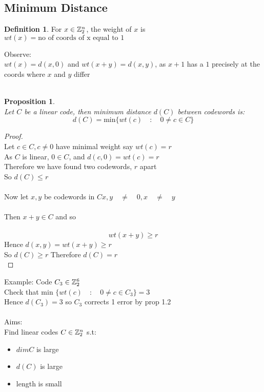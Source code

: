\documentclass[]{article}
\newtheorem{prop}[thm]{Proposition}
\theoremstyle{definition}
\newtheorem*{defn}{Definition}
\theoremstyle{remark}
\numberwithin{equation}{section}
\begin{document}
	\subsection{Minimum Distance}
		\begin{defn}
			For $x \in \mathbb{Z}_2^n$, the weight of $x$ is $wt(x) = \text{no of coords of x equal to 1}$
		\end{defn}
		Observe:\\
		$wt(x) = d(x, 0)$ and $wt(x+y) = d(x,y)$, as $x+1$ has a $1$ precisely at the coords where $x$ and $y$ differ\\
		\\
		\begin{prop}\hfill\\
		Let $C$ be a linear code, then minimum distance $d(C)$ between codewords is:\\
		\[
			d(C) = \text{min} \{ wt(c)\quad:\quad 0 \neq c \in C\}
		\]
		\end{prop}
		\begin{proof}\hfill\\
		Let $c \in C, c \neq 0$ have minimal weight say $wt(c) = r$\\
		As $C$ is linear, $0 \in C$, and $d(c,0) = wt(c) = r$\\
		Therefore we have found two codewords, $r$ apart\\
		So $d(C) \leq r$\\
		\\	
		Now let $x,y$ be codewords in $C x,y\quad \neq \quad 0, x\quad \neq \quad y$\\
		\\	
		Then $x+y \in C$ and so \\
		\\	
		\[
			wt(x+y)\geq r 	
		\]
		Hence $d(x,y) = wt(x+y) \geq r$ \\
		So $d(C) \geq r$ Therefore $d(C) = r$\\
		\end{proof}
		Example:
		Code $C_3 \in \mathbb{Z}_2^6$\\
		Check that min $\{wt(c) \quad:\quad 0 \neq c \in C_3\} = 3$\\
		Hence $d(C_3) = 3$ so $C_3$ corrects 1 error by prop 1.2\\
		\\

		Aims:\\
		Find linear codes $C \in \mathbb{Z}_2^n$ s.t:\\
		\begin{itemize}
		\item $dimC$ is large
		\item $d(C)$ is large
		\item length is small
		\end{itemize}
\end{document}
